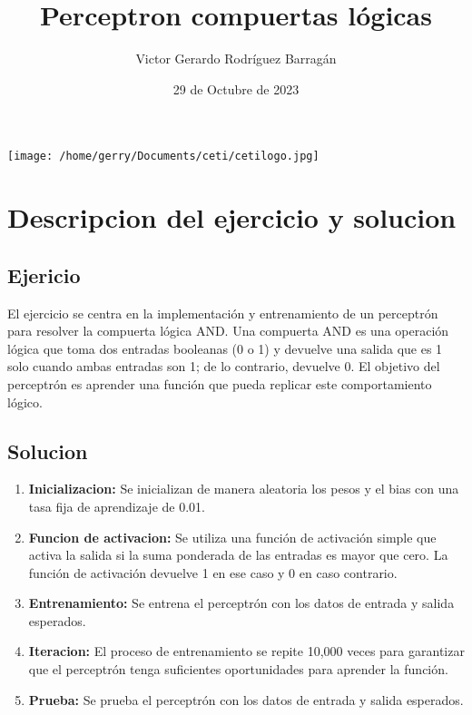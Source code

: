 \documentclass{article}
\title{Perceptron compuertas lógicas}
\author{Victor Gerardo Rodríguez Barragán}
\date{29 de Octubre de 2023}
\begin{document}
\maketitle
\begin{center}
    \texttt{[image: /home/gerry/Documents/ceti/cetilogo.jpg]}
\end{center}

\newpage
\justify
\section{Descripcion del ejercicio y solucion}
\subsection{Ejericio}
El ejercicio se centra en la implementación y entrenamiento de un perceptrón para resolver
la compuerta lógica AND. Una compuerta AND es una operación lógica que toma dos entradas
booleanas (0 o 1) y devuelve una salida que es 1 solo cuando ambas entradas son 1;
de lo contrario, devuelve 0. El objetivo del perceptrón es aprender una función que pueda replicar
este comportamiento lógico.
\subsection{Solucion}
\begin{enumerate}
\item \textbf{Inicializacion:} Se inicializan de manera aleatoria los pesos y el bias con una tasa fija
        de aprendizaje de 0.01.
\item \textbf{Funcion de activacion:} Se utiliza una función de activación simple que activa la salida si la suma ponderada de las entradas es mayor que cero. La función de activación devuelve 1 en ese caso y 0 en caso contrario.
\item \textbf{Entrenamiento:} Se entrena el perceptrón con los datos de entrada y salida esperados.
\item \textbf{Iteracion:} El proceso de entrenamiento se repite 10,000 veces para garantizar que el perceptrón tenga suficientes oportunidades para aprender la función.
\item \textbf{Prueba:} Se prueba el perceptrón con los datos de entrada y salida esperados.
\end{enumerate}
\end{document}
